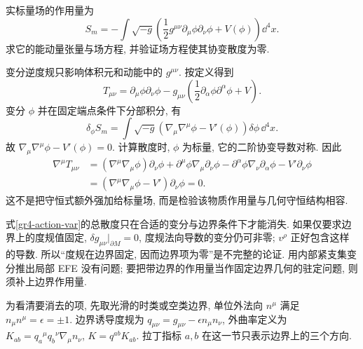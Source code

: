 \begin{example}
实标量场的作用量为
\[
 S_m=-\int\sqrt{-g}\left(\frac12g^{\mu\nu}\partial_\mu\phi\partial_\nu\phi
                        +V(\phi)\right)\dd^4x.
\]
求它的能动量张量与场方程, 并验证场方程使其协变散度为零.
\end{example}
\begin{solution}
变分逆度规只影响体积元和动能中的 $g^{\mu\nu}$. 按定义得到
\[
 T_{\mu\nu}=\partial_\mu\phi\partial_\nu\phi
 -g_{\mu\nu}\left(\frac12\partial_\alpha\phi\partial^\alpha\phi+V\right).
\]
变分 $\phi$ 并在固定端点条件下分部积分, 有
\[
 \delta_\phi S_m=\int\sqrt{-g}(\nabla_\mu\nabla^\mu\phi-V'(\phi))\delta\phi\,\dd^4x.
\]
故 $\nabla_\mu\nabla^\mu\phi-V'(\phi)=0$. 计算散度时, $\phi$ 为标量, 它的二阶协变导数对称. 因此
\begin{align*}
 \nabla^\mu T_{\mu\nu}
 &= (\nabla^\mu\nabla_\mu\phi)\partial_\nu\phi
 +\partial^\mu\phi\nabla_\mu\partial_\nu\phi
 -\partial^\alpha\phi\nabla_\nu\partial_\alpha\phi
 -V'\partial_\nu\phi\\
 &= (\nabla^\mu\nabla_\mu\phi-V')\partial_\nu\phi=0.
\end{align*}
这不是把守恒式额外强加给标量场, 而是检验该物质作用量与几何守恒结构相容.
\end{solution}


式\eqref{gr4-action-var}的总散度只在合适的变分与边界条件下才能消失. 如果仅要求边界上的度规值固定, $\delta g_{\mu\nu}|_{\partial M}=0$, 度规法向导数的变分仍可非零; $v^\rho$ 正好包含这样的导数. 所以“度规在边界固定, 因而边界项为零”是不完整的论证. 用内部紧支集变分推出局部 EFE 没有问题; 要把带边界的作用量当作固定边界几何的驻定问题, 则须补上边界作用量.

为看清要消去的项, 先取光滑的时类或空类边界, 单位外法向 $n^\mu$ 满足 $n_\mu n^\mu=\epsilon=\pm1$. 边界诱导度规为 $q_{\mu\nu}=g_{\mu\nu}-\epsilon n_\mu n_\nu$, 外曲率定义为 $K_{ab}=q_a{}^\mu q_b{}^\nu\nabla_\mu n_\nu$, $K=q^{ab}K_{ab}$. 拉丁指标 $a,b$ 在这一节只表示边界上的三个方向.

